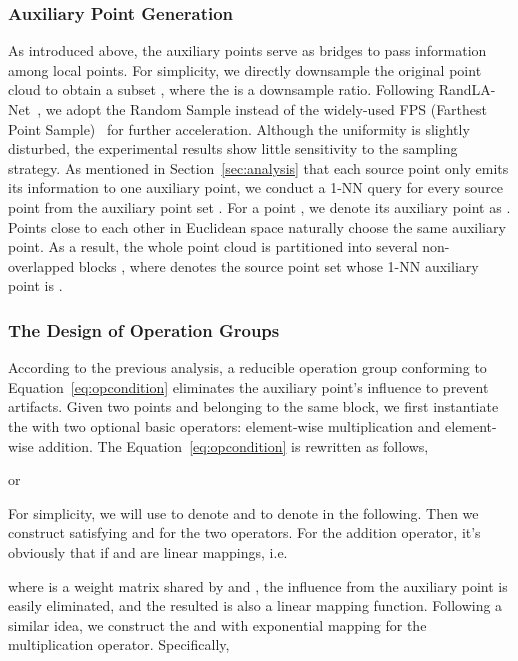 \documentclass[journal]{IEEEtran}
\begin{document}
\subsubsection{Auxiliary Point Generation}
\label{sec:blockpart}
As introduced above, the auxiliary points serve as bridges to pass information among local points. For simplicity, we directly downsample the original point cloud to obtain a subset , where the  is a downsample ratio. Following RandLA-Net~\cite{randla}, we adopt the Random Sample instead of the widely-used FPS (Farthest Point Sample)~\cite{PointNet++} for further acceleration. Although the uniformity is slightly disturbed, the experimental results show 
little sensitivity to the sampling strategy. As mentioned in Section~\ref{sec:analysis} that each source point only emits its information to one auxiliary point, we conduct a 1-NN query for every source point from the auxiliary point set . For a point , we denote its auxiliary point as . Points close to each other in Euclidean space naturally choose the same auxiliary point. As a result, the whole point cloud is partitioned into several non-overlapped blocks , where  denotes the source point set whose 1-NN auxiliary point is . 



\subsubsection{The Design of Operation Groups}
According to the previous analysis, a reducible operation group conforming to Equation~\ref{eq:opcondition} eliminates the auxiliary point's influence to prevent artifacts. Given two points  and  belonging to the same block, we first instantiate the  with two optional basic operators: element-wise multiplication and element-wise addition. The Equation~\ref{eq:opcondition} is rewritten as follows,



\noindent
or



\noindent
For simplicity, we will use  to denote  and  to denote  in the following. Then we construct satisfying  and  for the two operators. For the addition operator, it's obviously that if  and  are linear mappings, i.e. 


\begin{small}

\end{small}


\noindent
where  is a weight matrix shared by  and , the influence from the auxiliary point is easily eliminated, and the resulted  is also a linear mapping function. Following a similar idea, we construct the  and  with exponential mapping for the multiplication operator. Specifically, 
\end{document}
